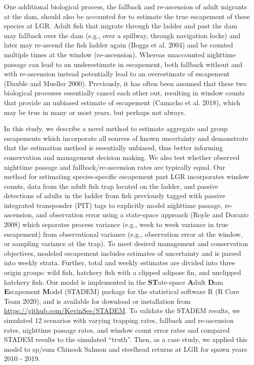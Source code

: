 \documentclass[
  12pt,
]{article}
\begin{document}
One additional biological process, the fallback and re-ascension of adult migrants at the dam, should also be accounted for to estimate the true escapement of these species at LGR. Adult fish that migrate through the ladder and past the dam may fallback over the dam (e.g., over a spillway, through navigation locks) and later may re-ascend the fish ladder again (Boggs et al. 2004) and be counted multiple times at the window (re-ascension). Whereas unaccounted nighttime passage can lead to an underestimate in escapement, both fallback without and with re-ascension instead potentially lead to an overestimate of escapement (Dauble and Mueller 2000). Previously, it has often been assumed that these two biological processes essentially cancel each other out, resulting in window counts that provide an unbiased estimate of escapement (Camacho et al. 2018), which may be true in many or most years, but perhaps not always.

In this study, we describe a novel method to estimate aggregate and group escapements which incorporate all sources of known uncertainty and demonstrate that the estimation method is essentially unbiased, thus better informing conservation and management decision making. We also test whether observed nighttime passage and fallback/re-ascension rates are typically equal. Our method for estimating species-specific escapement past LGR incorporates window counts, data from the adult fish trap located on the ladder, and passive detections of adults in the ladder from fish previously tagged with passive integrated transponder (PIT) tags to explicitly model nighttime passage, re-ascension, and observation error using a state-space approach (Royle and Dorazio 2008) which separates process variance (e.g., week to week variance in true escapement) from observational variance (e.g., observation error at the window, or sampling variance at the trap). To meet desired management and conservation objectives, modeled escapement includes estimates of uncertainty and is parsed into weekly strata. Further, total and weekly estimates are divided into three origin groups: wild fish, hatchery fish with a clipped adipose fin, and unclipped hatchery fish. Our model is implemented in the \textbf{ST}ate-space \textbf{A}dult \textbf{D}am \textbf{E}scapement \textbf{M}odel (STADEM) package for the statistical software R (R Core Team 2020), and is available for download or installation from \url{https://github.com/KevinSee/STADEM}. To validate the STADEM results, we simulated 12 scenarios with varying trapping rates, fallback and re-ascension rates, nighttime passage rates, and window count error rates and compared STADEM results to the simulated ``truth''. Then, as a case study, we applied this model to sp/sum Chinook Salmon and steelhead returns at LGR for spawn years 2010 - 2019.
\end{document}
